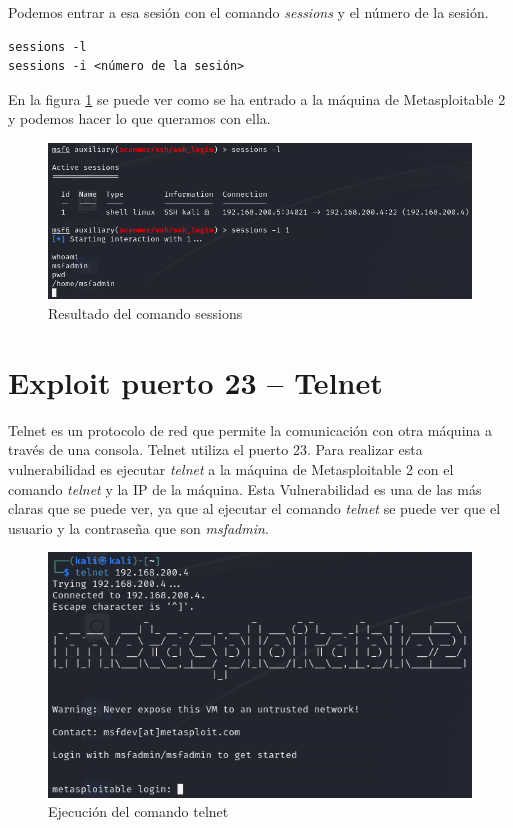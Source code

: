 \documentclass[11pt]{report}
\begin{document}
Podemos entrar a esa sesión con el comando \emph{sessions} y el número de la sesión.
\begin{verbatim}
sessions -l
sessions -i <número de la sesión>
\end{verbatim}

En la figura \ref{fig:Resultado del comando sessions} se puede ver como se ha entrado a la máquina de Metasploitable 2 y podemos hacer lo que queramos con ella.

\begin{figure}[H]
  \centering
  \includegraphics[scale=0.6]{img/ssh_msf_session.png}
  \caption{Resultado del comando sessions}
  \label{fig:Resultado del comando sessions}
\end{figure}

\section{Exploit puerto 23 – Telnet}
Telnet es un protocolo de red que permite la comunicación con otra máquina a través de una consola. Telnet utiliza el puerto 23. Para realizar esta vulnerabilidad
es ejecutar \emph{telnet} a la máquina de Metasploitable 2 con el comando \emph{telnet} y la IP de la máquina. Esta Vulnerabilidad 
es una de las más claras que se puede ver, ya que al ejecutar el comando \emph{telnet} se puede ver que el usuario y la contraseña que son \emph{msfadmin}.
\begin{figure}[H]
  \centering
  \includegraphics[scale=0.7]{img/telnet.png}
  \caption{Ejecución del comando telnet}
\end{figure}
\end{document}
